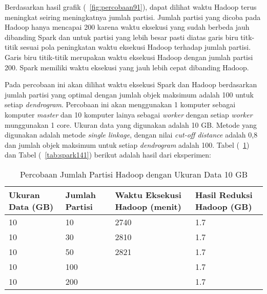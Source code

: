 Berdasarkan hasil grafik (~\ref{fig:percobaan91}), dapat dilihat waktu Hadoop terus meningkat seiring meningkatnya jumlah partisi. Jumlah partisi yang dicoba pada Hadoop hanya mencapai 200 karena waktu eksekusi yang sudah berbeda jauh dibanding Spark dan untuk partisi yang lebih besar pasti diatas garis biru titk-titik sesuai pola peningkatan waktu eksekusi Hadoop terhadap jumlah partisi. Garis biru titik-titik merupakan waktu eksekusi Hadoop dengan jumlah partisi 200. Spark memiliki waktu eksekusi yang jauh lebih cepat dibanding Hadoop.  



Pada percobaan ini akan dilihat waktu eksekusi Spark dan Hadoop berdasarkan jumlah partisi yang optimal dengan jumlah objek maksimum adalah 100 untuk setiap \textit{dendrogram}. Percobaan ini akan menggunakan 1 komputer sebagai komputer \textit{master} dan 10 komputer lainya sebagai \textit{worker} dengan setiap \textit{worker} munggunakan 1 core. Ukuran data yang digunakan adalah 10 GB. Metode yang digunakan adalah metode \textit{single linkage}, dengan nilai \textit{cut-off distance} adalah 0,8 dan jumlah objek maksimum untuk setiap \textit{dendrogram} adalah 100. Tabel (~\ref{tab:spark131}) dan Tabel (~\ref{tab:spark141}) berikut adalah hasil dari eksperimen:





\begin{table}[H] 
	\centering 
	\caption{Percobaan Jumlah Partisi Hadoop dengan Ukuran Data 10 GB}
	\label{tab:spark131}
	\begin{tabular}{|p{3cm}|p{3cm}|p{4cm}|p{4cm}|}
\hline
Ukuran Data (GB) & Jumlah Partisi &  Waktu Eksekusi Hadoop (menit) & Hasil Reduksi Hadoop (GB)\\
\hline
10 & 10 & 2740  & 1.7  \\
\hline
10 & 30 & 2810  & 1.7  \\
\hline
10 & 50 & 2821  & 1.7   \\
\hline
10 & 100 &   & 1.7   \\
\hline
10 & 200 &   & 1.7   \\
\hline


\hline

	\end{tabular} 
\end{table}




